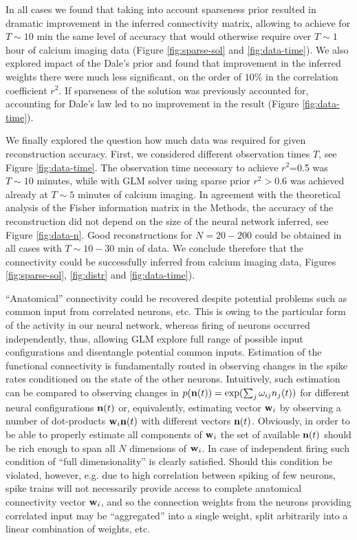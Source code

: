 In all cases we found that taking into account sparseness prior resulted in dramatic improvement in the inferred connectivity matrix, allowing to achieve for $T\sim 10$ min the same level of accuracy that would otherwise require over $T\sim 1$ hour of calcium imaging data (Figure \ref{fig:sparse-sol} and \ref{fig:data-time}). We also explored impact of the Dale's prior and found that improvement in the inferred weights there were much less significant, on the order of $10\%$ in the correlation coefficient $r^2$. If sparseness of the solution was previously accounted for, accounting for Dale's law led to no improvement in the result (Figure \ref{fig:data-time}).

We finally explored the question how much data was required for given reconstruction accuracy. First, we considered different observation times $T$, see Figure \ref{fig:data-time}. The observation time necessary to achieve $r^2$=0.5 was $T\sim 10$ minutes, while with GLM solver using sparse prior $r^2>0.6$ was achieved already at $T\sim 5$ minutes of calcium imaging. In agreement with the theoretical analysis of the Fisher information matrix in the Methods, the accuracy of the reconstruction did not depend on the size of the neural network inferred, see Figure \ref{fig:data-n}. Good reconstructions for $N=20-200$ could be obtained in all cases with $T\sim 10-30$ min of data. We conclude therefore that the connectivity could be successfully inferred from calcium imaging data, Figures \ref{fig:sparse-sol}, \ref{fig:distr} and \ref{fig:data-time}).

``Anatomical'' connectivity could be recovered despite potential problems such as common input from correlated neurons, etc. This is owing to the particular form of the activity in our neural network, whereas firing of neurons occurred independently, thus, allowing GLM explore full range of possible input configurations and disentangle potential common inputs.  Estimation of the functional connectivity is fundamentally routed in observing changes in the spike rates conditioned on the state of the other neurons. Intuitively, such estimation can be compared to observing changes in $p({\bf n}(t))=\exp(\sum_j \omega_{ij}n_j(t))$ for different neural configurations ${\bf n}(t)$ or, equivalently, estimating vector ${\bf w}_i$ by observing a number of dot-products ${\bf w}_i {\bf n}(t)$ with different vectors ${\bf n}(t)$. Obviously, in order to be able to properly estimate all components of ${\bf w}_i$ the set of available ${\bf n}(t)$ should be rich enough to span all $N$ dimensions of ${\bf w}_i$. In case of independent firing such condition of ``full dimensionality'' is clearly satisfied.  Should this condition be violated, however, e.g. due to high correlation between spiking of few neurons, spike trains will not necessarily provide access to complete anatomical connectivity vector ${\bf w}_i$, and so the connection weights from the neurons providing correlated input may be ``aggregated'' into a single weight, split arbitrarily into a linear combination of weights, etc.

